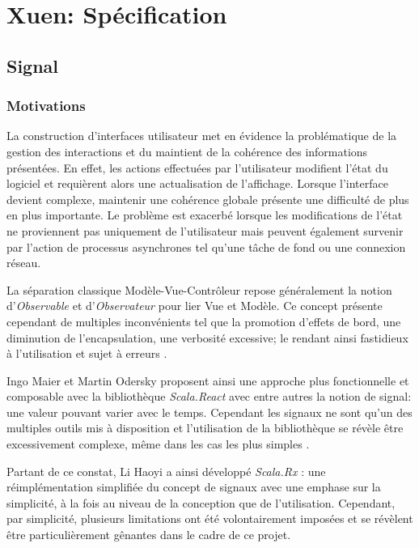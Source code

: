 \chapter{Xuen: Spécification}

\section{Signal}

\subsection{Motivations}

La construction d'interfaces utilisateur met en évidence la problématique de la gestion des interactions et du maintient de la cohérence des informations présentées. En effet, les actions effectuées par l'utilisateur modifient l'état du logiciel et requièrent alors une actualisation de l'affichage. Lorsque l'interface devient complexe, maintenir une cohérence globale présente une difficulté de plus en plus importante. Le problème est exacerbé lorsque les modifications de l'état ne proviennent pas uniquement de l'utilisateur mais peuvent également survenir par l'action de processus asynchrones tel qu'une tâche de fond ou une connexion réseau.

La séparation classique Modèle-Vue-Contrôleur repose généralement la notion d'\emph{Observable} et d'\emph{Observateur} pour lier Vue et Modèle. Ce concept présente cependant de multiples inconvénients tel que la promotion d'effets de bord, une diminution de l'encapsulation, une verbosité excessive; le rendant ainsi fastidieux à l'utilisation et sujet à erreurs \cite{odersky2012}.

Ingo Maier et Martin Odersky proposent ainsi une approche plus fonctionnelle et composable avec la bibliothèque \emph{Scala.React} \cite{scala-react} avec entre autres la notion de signal: une valeur pouvant varier avec le temps. Cependant les signaux ne sont qu'un des multiples outils mis à disposition et l'utilisation de la bibliothèque se révèle être excessivement complexe, même dans les cas les plus simples \cite[\small Related~Work]{scala.rx}.

Partant de ce constat, Li Haoyi a ainsi développé \emph{Scala.Rx} \cite{scala.rx}: une réimplémentation simplifiée du concept de signaux avec une emphase sur la simplicité, à la fois au niveau de la conception que de l'utilisation. Cependant, par simplicité, plusieurs limitations ont été volontairement imposées et se révèlent être particulièrement gênantes dans le cadre de ce projet.

